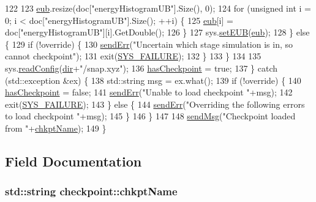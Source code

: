 \begin{DoxyCode}
122 
123             \hyperlink{classcheckpoint_a7071b01d0936873321d0a706e761b6ac}{eub}.resize(doc[\textcolor{stringliteral}{"energyHistogramUB"}].Size(), 0);
124             \textcolor{keywordflow}{for} (\textcolor{keywordtype}{unsigned} \textcolor{keywordtype}{int} i = 0; i < doc[\textcolor{stringliteral}{"energyHistogramUB"}].Size(); ++i) \{
125                 \hyperlink{classcheckpoint_a7071b01d0936873321d0a706e761b6ac}{eub}[i] = doc[\textcolor{stringliteral}{"energyHistogramUB"}][i].GetDouble();
126             \}
127             sys.\hyperlink{classsim_system_ab894de5ccd37efa97ae799f1dc1875a1}{setEUB}(\hyperlink{classcheckpoint_a7071b01d0936873321d0a706e761b6ac}{eub});
128         \} \textcolor{keywordflow}{else} \{
129             \textcolor{keywordflow}{if} (!\textcolor{keyword}{override}) \{
130                 \hyperlink{utilities_8cpp_a6dacf3c3c19aa1e13a4d5a148fe5114e}{sendErr}(\textcolor{stringliteral}{"Uncertain which stage simulation is in, so cannot checkpoint"});
131                 exit(\hyperlink{global_8h_a428dfe1ef0a6ff4b1fdebf275f6aff2e}{SYS\_FAILURE});
132             \}
133         \}
134 
135         sys.\hyperlink{classsim_system_a3161d95bbb800d5d95a732ac5fc32b95}{readConfig}(\hyperlink{classcheckpoint_a0e0f999ee8e0b09541e9131baa8a591d}{dir}+\textcolor{stringliteral}{"/snap.xyz"});
136         \hyperlink{classcheckpoint_aa75f306fcb0c2360d948fa3a61adfed5}{hasCheckpoint} = \textcolor{keyword}{true};
137     \} \textcolor{keywordflow}{catch} (std::exception &ex) \{
138         std::string msg = ex.what();
139         \textcolor{keywordflow}{if} (!\textcolor{keyword}{override}) \{
140             \hyperlink{classcheckpoint_aa75f306fcb0c2360d948fa3a61adfed5}{hasCheckpoint} = \textcolor{keyword}{false};
141             \hyperlink{utilities_8cpp_a6dacf3c3c19aa1e13a4d5a148fe5114e}{sendErr}(\textcolor{stringliteral}{"Unable to load checkpoint "}+msg);
142             exit(\hyperlink{global_8h_a428dfe1ef0a6ff4b1fdebf275f6aff2e}{SYS\_FAILURE});
143         \} \textcolor{keywordflow}{else} \{
144             \hyperlink{utilities_8cpp_a6dacf3c3c19aa1e13a4d5a148fe5114e}{sendErr}(\textcolor{stringliteral}{"Overriding the following errors to load checkpoint "}+msg);
145         \}
146     \}
147 
148     \hyperlink{utilities_8cpp_a08974c73a5b36c28b8ad1ef47fca77b0}{sendMsg}(\textcolor{stringliteral}{"Checkpoint loaded from "}+\hyperlink{classcheckpoint_a477eea21621f066889660ed426dc800f}{chkptName});
149 \}
\end{DoxyCode}


\subsection{Field Documentation}
\hypertarget{classcheckpoint_a477eea21621f066889660ed426dc800f}{
\subsubsection[{chkpt\-Name}]{\setlength{\rightskip}{0pt plus 5cm}std\-::string checkpoint\-::chkpt\-Name}}\label{classcheckpoint_a477eea21621f066889660ed426dc800f}


